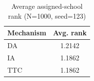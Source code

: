 \begin{table}[H]
\centering
\caption{Average assigned-school rank (N=1000, seed=123)}
\label{tab:avg_rank_seed123}
\begin{tabular}{lc}
\hline
Mechanism & Avg. rank \\
\hline
DA & 1.2142 \\
IA & 1.1862 \\
TTC & 1.1862 \\
\hline
\end{tabular}
\end{table}